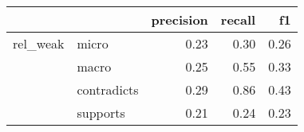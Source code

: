\begin{tabular}{llrrr}
\toprule
         &          &  precision &  recall &   f1 \\
\midrule
rel\_weak & micro &       0.23 &    0.30 & 0.26 \\
         & macro &       0.25 &    0.55 & 0.33 \\
         & contradicts &       0.29 &    0.86 & 0.43 \\
         & supports &       0.21 &    0.24 & 0.23 \\
\bottomrule
\end{tabular}
